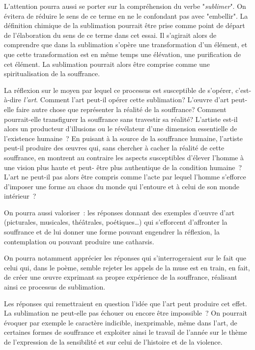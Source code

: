 {L'attention pourra aussi se porter sur la compréhension du verbe "\textit{sublimer}". On évitera de
réduire le sens de ce terme en ne le confondant pas avec "embellir". La définition chimique de la
sublimation pourrait être prise comme point de départ de l'élaboration du sens de ce terme dans
cet essai. Il s'agirait alors de comprendre que dans la sublimation s'opère une transformation d'un
élément, et que cette transformation est en même temps une élévation, une purification de cet
élément. La sublimation pourrait alors être comprise comme une spiritualisation de la souffrance.

La réflexion sur le moyen par lequel ce processus est susceptible de s'opérer, c'est-à-dire
\textit{l'art}. Comment l'art peut-il opérer cette sublimation? L'œuvre d'art peut-elle faire autre chose que
représenter la réalité de la souffrance? Comment pourrait-elle transfigurer la souffrance sans
travestir sa réalité? L'artiste est-il alors un producteur d'illusions ou le révélateur d'une dimension
essentielle de l'existence humaine~? En puisant à la source de la souffrance humaine, l'artiste
peut-il produire des œuvres qui, sans chercher à cacher la réalité de cette souffrance, en
montrent au contraire les aspects susceptibles d'élever l'homme à une vision plus haute et peut-
être plus authentique de la condition humaine~? L'art ne peut-il pas alors être compris comme
l'acte par lequel l'homme s'efforce d'imposer une forme au chaos du monde qui l'entoure et à
celui de son monde intérieur~?

On pourra aussi valoriser~: les réponses donnant des exemples d'œuvre d'art (picturales,
musicales, théâtrales, poétiques…) qui s'efforcent d'affronter la souffrance et de lui donner une
forme pouvant engendrer la réflexion, la contemplation ou pouvant produire une catharsis.

On pourra notamment apprécier les réponses qui s'interrogeraient sur le fait que celui qui,
dans le poème, semble rejeter les appels de la muse est en train, en fait, de créer une œuvre
exprimant sa propre expérience de la souffrance, réalisant ainsi ce processus de sublimation.

Les réponses qui remettraient en question l'idée que l'art peut produire cet effet. La
sublimation ne peut-elle pas échouer ou encore être impossible~? On pourrait évoquer par
exemple le caractère indicible, inexprimable, même dans l'art, de certaines formes de souffrance
et exploiter ainsi le travail de l'année sur le thème de l'expression de la sensibilité et sur celui de
l'histoire et de la violence.}

